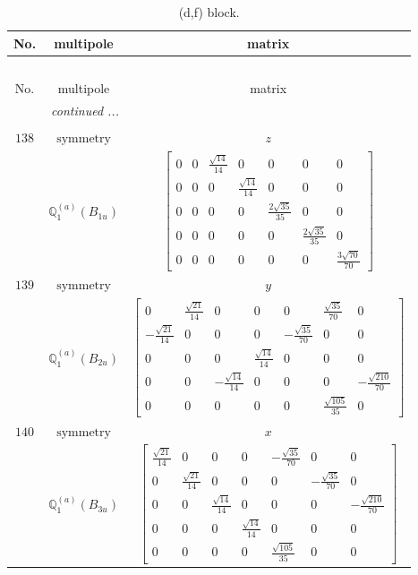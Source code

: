\documentclass[fleqn,8pt,landscape]{jsarticle}
\begin{document}
\begin{longtable}{ccc}
\caption{(d,f) block.}
 \\
 \hline \hline
No. & multipole & matrix \\ \hline \endfirsthead

\multicolumn{2}{l}{\tablename\ \thetable{}} \\
 \hline \hline
No. & multipole & matrix \\ \hline \endhead

 \hline \hline
\multicolumn{2}{r}{\footnotesize\it continued ...} \\ \endfoot

 \hline \hline
\multicolumn{2}{r}{} \\ \endlastfoot

$ 138 $ & $ \text{symmetry} $ & $ z $ \\
$  $ & $ \mathbb{Q}_{1}^{(a)}(B_{1u}) $ & $ \begin{bmatrix} 0 & 0 & \frac{\sqrt{14}}{14} & 0 & 0 & 0 & 0 \\ 0 & 0 & 0 & \frac{\sqrt{14}}{14} & 0 & 0 & 0 \\ 0 & 0 & 0 & 0 & \frac{2 \sqrt{35}}{35} & 0 & 0 \\ 0 & 0 & 0 & 0 & 0 & \frac{2 \sqrt{35}}{35} & 0 \\ 0 & 0 & 0 & 0 & 0 & 0 & \frac{3 \sqrt{70}}{70} \end{bmatrix} $ \\ \hline
$ 139 $ & $ \text{symmetry} $ & $ y $ \\
$  $ & $ \mathbb{Q}_{1}^{(a)}(B_{2u}) $ & $ \begin{bmatrix} 0 & \frac{\sqrt{21}}{14} & 0 & 0 & 0 & \frac{\sqrt{35}}{70} & 0 \\ - \frac{\sqrt{21}}{14} & 0 & 0 & 0 & - \frac{\sqrt{35}}{70} & 0 & 0 \\ 0 & 0 & 0 & \frac{\sqrt{14}}{14} & 0 & 0 & 0 \\ 0 & 0 & - \frac{\sqrt{14}}{14} & 0 & 0 & 0 & - \frac{\sqrt{210}}{70} \\ 0 & 0 & 0 & 0 & 0 & \frac{\sqrt{105}}{35} & 0 \end{bmatrix} $ \\ \hline
$ 140 $ & $ \text{symmetry} $ & $ x $ \\
$  $ & $ \mathbb{Q}_{1}^{(a)}(B_{3u}) $ & $ \begin{bmatrix} \frac{\sqrt{21}}{14} & 0 & 0 & 0 & - \frac{\sqrt{35}}{70} & 0 & 0 \\ 0 & \frac{\sqrt{21}}{14} & 0 & 0 & 0 & - \frac{\sqrt{35}}{70} & 0 \\ 0 & 0 & \frac{\sqrt{14}}{14} & 0 & 0 & 0 & - \frac{\sqrt{210}}{70} \\ 0 & 0 & 0 & \frac{\sqrt{14}}{14} & 0 & 0 & 0 \\ 0 & 0 & 0 & 0 & \frac{\sqrt{105}}{35} & 0 & 0 \end{bmatrix} $ \\ \hline

\end{longtable}
\end{document}
